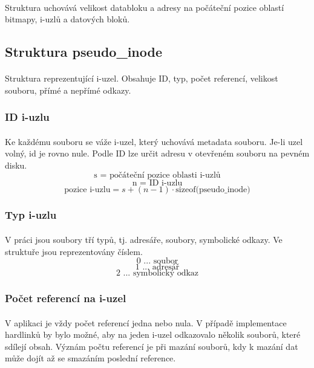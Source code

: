 \documentclass[12pt]{scrartcl}
\begin{document}
\paragraph{}
Struktura uchovává velikost databloku a adresy na počáteční pozice oblastí bitmapy, i-uzlů a datových bloků.

\subsection{Struktura pseudo\_inode}
\paragraph{}
Struktura reprezentující i-uzel. Obsahuje ID, typ, počet referencí, velikost souboru, přímé a nepřímé odkazy.
\subsubsection{ID i-uzlu}
\paragraph{}
Ke každému souboru se váže i-uzel, který uchovává metadata souboru. Je-li uzel volný, id je rovno nule. Podle ID lze určit adresu v otevřeném souboru na pevném disku. 
$$
\text{s = počáteční pozice oblasti i-uzlů}
$$
$$
\text{n = ID i-uzlu}
$$
$$
\text{pozice i-uzlu} = s + \left( n-1 \right) \cdot \text{sizeof(pseudo\_inode)}
$$
\subsubsection{Typ i-uzlu}
\paragraph{}
V práci jsou soubory tří typů, tj. adresáře, soubory, symbolické odkazy. Ve struktuře jsou reprezentovány číslem.
$$
\text{0 ... soubor}
$$
$$
\text{1 ... adresář}
$$
$$
\text{2 ... symbolický odkaz}
$$

\subsubsection{Počet referencí na i-uzel}
\paragraph{}
V aplikaci je vždy počet referencí jedna nebo nula. V případě implementace hardlinků by bylo možné, aby na jeden i-uzel odkazovalo několik souborů, které sdílejí obsah. Význám počtu referencí je při mazání souborů, kdy k mazání dat může dojít až se smazáním poslední reference.
\end{document}
